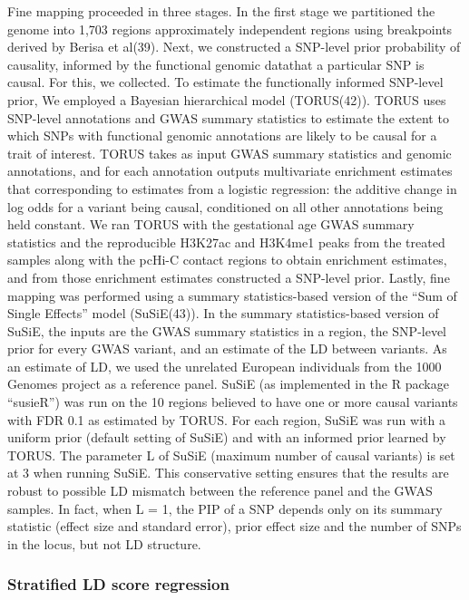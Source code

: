 Fine mapping proceeded in three stages. In the first stage we partitioned the genome into 1,703 regions approximately independent regions using breakpoints derived by Berisa et al(39).
 Next, we constructed a SNP-level prior probability of causality, informed by the functional genomic datathat a particular SNP is causal. For this, we collected. 
To estimate the functionally informed SNP-level prior, We employed a Bayesian hierarchical model (TORUS(42)).  
TORUS uses SNP-level annotations and GWAS summary statistics to estimate the extent to which SNPs with functional genomic annotations are likely to be causal for a trait of interest.  
TORUS takes as input GWAS summary statistics and genomic annotations, and for each annotation outputs multivariate enrichment estimates that corresponding to estimates from a logistic regression: 
the additive change in log odds for a variant being causal, conditioned on all other annotations being held constant.  
We ran TORUS with the gestational age GWAS summary statistics and the reproducible H3K27ac and H3K4me1 peaks from the treated samples along with the pcHi-C contact regions to obtain enrichment estimates, 
and from those enrichment estimates constructed a SNP-level prior. Lastly, fine mapping was performed using a summary statistics-based version of the “Sum of Single Effects” model (SuSiE(43)).  
In the summary statistics-based version of SuSiE, the inputs are the GWAS summary statistics in a region, the SNP-level prior for every GWAS variant, and an estimate of the LD between variants. 
As an estimate of LD, we used the unrelated European individuals from the 1000 Genomes project as a reference panel. SuSiE (as implemented in the R package “susieR”) was run on the 10 regions 
believed to have one or more causal variants with FDR 0.1 as estimated by TORUS. For each region, SuSiE was run with a uniform prior (default setting of SuSiE) and with an informed prior learned 
by TORUS. The parameter L of SuSiE (maximum number of causal variants) is set at 3 when running SuSiE. This conservative setting ensures that the results are robust to possible LD mismatch between 
the reference panel and the GWAS samples. In fact, when L = 1, the PIP of a SNP depends only on its summary statistic (effect size and standard error), prior effect size and the number of SNPs in the locus, 
but not LD structure.  


\subsubsection{Stratified LD score regression}\label{sec:org3173e32}

